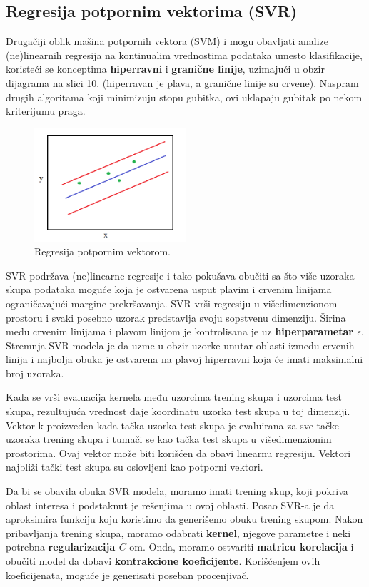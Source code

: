 \documentclass[fontsize=12bp, paper=a4]{scrarticle}
\begin{document}
\newpage
\subsection{Regresija potpornim vektorima (SVR)}
Drugačiji oblik mašina potpornih vektora (SVM) i mogu obavljati analize (ne)linearnih regresija na kontinualim vrednostima podataka umesto klasifikacije, koristeći se konceptima \textbf{hiperravni} i \textbf{granične linije}, uzimajući u obzir dijagrama na slici 10. (hiperravan je plava, a granične linije su crvene). Naspram drugih algoritama koji minimizuju stopu gubitka, ovi uklapaju gubitak po nekom kriterijumu praga.


\begin{figure}[h!]
    \centering
    \includegraphics[width=0.5\textwidth]{10.png}
    \caption{\centering Regresija potpornim vektorom.}
\end{figure}

SVR podržava (ne)linearne regresije i tako pokušava obučiti sa što više uzoraka skupa podataka moguće koja je ostvarena usput plavim i crvenim linijama ograničavajući margine prekršavanja. SVR vrši regresiju u višedimenzionom prostoru i svaki posebno uzorak predstavlja svoju sopstvenu dimenziju. Širina među crvenim linijama i plavom linijom je kontrolisana je uz \textbf{hiperparametar $\epsilon$}. Stremnja SVR modela je da uzme u obzir uzorke unutar oblasti između crvenih linija i najbolja obuka je ostvarena na plavoj hiperravni koja će imati maksimalni broj uzoraka.

Kada se vrši evaluacija kernela među uzorcima trening skupa i uzorcima test skupa, rezultujuća vrednost daje koordinatu uzorka test skupa u toj dimenziji. Vektor k proizveden kada tačka uzorka test skupa je evaluirana za sve tačke uzoraka trening skupa i tumači se kao tačka test skupa u višedimenzionim prostorima. Ovaj vektor može biti korišćen da obavi linearnu regresiju. Vektori najbliži tački test skupa su oslovljeni kao {potporni vektori}.

Da bi se obavila obuka SVR modela, moramo imati trening skup, koji pokriva oblast interesa i podstaknut je rešenjima u ovoj oblasti. Posao SVR-a je da aproksimira funkciju koju koristimo da generišemo obuku trening skupom. Nakon pribavljanja trening skupa, moramo odabrati \textbf{kernel}, njegove parametre i neki potrebna \textbf{regularizacija $C$}-om. Onda, moramo ostvariti \textbf{matricu korelacija} i obučiti model da dobavi \textbf{kontrakcione koeficijente}. Korišćenjem ovih koeficijenata, moguće je generisati poseban procenjivač.
\end{document}
